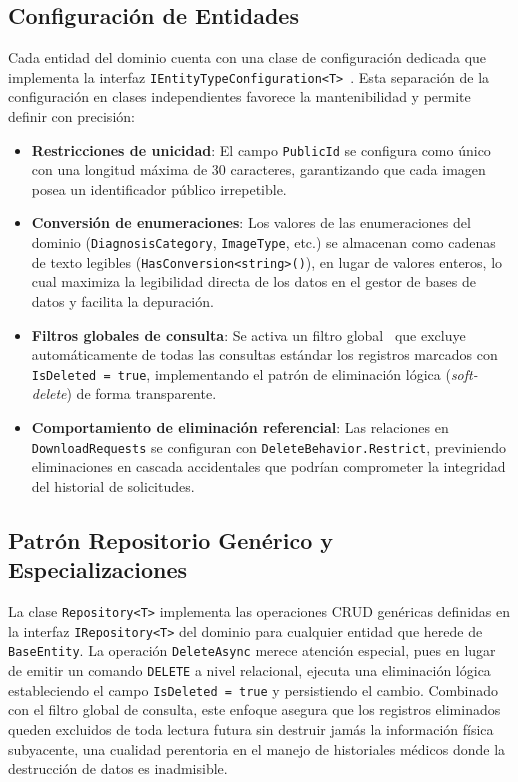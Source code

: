 \subsection{Configuración de Entidades}
Cada entidad del dominio cuenta con una clase de configuración dedicada que implementa la interfaz 
\texttt{IEntityTypeConfiguration<T>}~\cite{ef_core_fluent_api}. Esta separación de la configuración en 
clases independientes favorece la mantenibilidad y permite definir con precisión:

\begin{itemize}
    \item \textbf{Restricciones de unicidad}: El campo \texttt{PublicId} se configura como único con una 
    longitud máxima de 30 caracteres, garantizando que cada imagen posea un identificador público irrepetible.
    \item \textbf{Conversión de enumeraciones}: Los valores de las enumeraciones del dominio 
    (\texttt{DiagnosisCategory}, \texttt{ImageType}, etc.) se almacenan como cadenas de texto 
    legibles (\texttt{HasConversion<string>()}), en lugar de valores enteros, lo cual maximiza la 
    legibilidad directa de los datos en el gestor de bases de datos y facilita la depuración.
    \item \textbf{Filtros globales de consulta}: Se activa un filtro global~\cite{ef_core_query_filters} 
    que excluye automáticamente de todas las consultas estándar los registros marcados con 
    \texttt{IsDeleted = true}, implementando el patrón de eliminación lógica (\textit{soft-delete}) 
    de forma transparente.
    \item \textbf{Comportamiento de eliminación referencial}: Las relaciones en \texttt{DownloadRequests} se 
    configuran con \texttt{DeleteBehavior.Restrict}, previniendo eliminaciones en cascada accidentales que 
    podrían comprometer la integridad del historial de solicitudes.
\end{itemize}


\subsection{Patrón Repositorio Genérico y Especializaciones}
La clase \texttt{Repository<T>} implementa las operaciones CRUD genéricas definidas en la interfaz 
\texttt{IRepository<T>} del dominio para cualquier entidad que herede de \texttt{BaseEntity}. La 
operación \texttt{DeleteAsync} merece atención especial, pues en lugar de emitir un comando 
\texttt{DELETE} a nivel relacional, ejecuta una eliminación lógica estableciendo el campo 
\texttt{IsDeleted = true} y persistiendo el cambio. Combinado con el filtro global de consulta, 
este enfoque asegura que los registros eliminados queden excluidos de toda lectura futura sin 
destruir jamás la información física subyacente, una cualidad perentoria en el manejo de historiales 
médicos donde la destrucción de datos es inadmisible.

